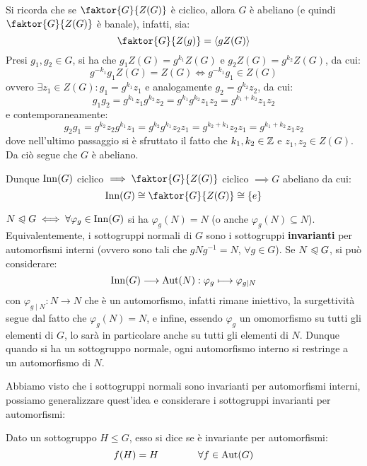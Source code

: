 \documentclass[11pt]{scrartcl}
\begin{document}
\begin{remark}
    Si ricorda che se $\faktor{G}{Z(G)}$ è ciclico, allora $G$ è abeliano (e quindi $\faktor{G}{Z(G)}$ è banale), infatti, sia:
        \[ \faktor{G}{Z(g)} = \left<gZ(G)\right>
            \]
    Presi $g_1,g_2 \in G$, si ha che $g_1Z(G) = g^{k_1}Z(G)$ e $g_2Z(G) = g^{k_2}Z(G)$, da cui:
        \[ g^{-k_1}g_1Z(G) = Z(G) \iff  g^{-k_1}g_1 \in Z(G)
            \]
    ovvero $\exists z_1 \in Z(G): g_1 = g^{k_1}z_1$ e analogamente $g_2 = g^{k_2}z_2$, da cui:
        \[ g_1g_2 = g^{k_1}z_1g^{k_2}z_2 = g^{k_1}g^{k_2}z_1z_2 = g^{k_1+k_2}z_1z_2
            \]
    e contemporaneamente:
        \[ g_2g_1 = g^{k_2}z_2g^{k_1}z_1 = g^{k_2}g^{k_1}z_2z_1 = g^{k_2 + k_1}z_2z_1 = g^{k_1+k_2}z_1z_2
            \]
    dove nell'ultimo passaggio si è sfruttato il fatto che $k_1,k_2 \in \mathbb Z$ e $z_1,z_2 \in Z(G)$. Da ciò segue che $G$ è abeliano.
\end{remark}

\begin{remark}
    Dunque $\operatorname{Inn}(G)$ ciclico $\implies \faktor{G}{Z(G)}$ ciclico $\implies G$ abeliano da cui:  
        \[ \Inn(G) \cong \faktor{G}{Z(G)} \cong \{e\}
            \]
\end{remark}

\begin{remark}
    $N \trianglelefteqslant G \iff \forall \varphi_g \in \operatorname{Inn}(G)$ si ha $\varphi_g(N) = N$ (o anche $\varphi_g(N) \subseteq N$). Equivalentemente, i sottogruppi
    normali di $G$ sono i sottogruppi \textbf{invarianti} per automorfismi interni (ovvero sono tali che $gNg^{-1} = N$, $\forall g \in G$). Se $N \trianglelefteqslant G$, si può considerare:
        \[ \operatorname{Inn}(G) \longrightarrow \operatorname{Aut}(N) : \varphi_g \longmapsto \varphi_{g \mid N}
            \]
    con $\varphi_{g \mid N} : N \longrightarrow N$ che è un automorfismo, infatti rimane iniettivo, la surgettività segue dal fatto che $\varphi_g(N) = N$, e infine, essendo $\varphi_g$ 
    un omomorfismo su tutti gli elementi di $G$, lo sarà in particolare anche su tutti gli elementi di $N$. Dunque quando si ha un sottogruppo normale, ogni automorfismo interno si restringe
    a un automorfismo di $N$.
\end{remark}

Abbiamo visto che i sottogruppi normali sono invarianti per automorfismi interni, possiamo generalizzare quest'idea e considerare i sottogruppi invarianti per automorfismi:

\begin{definition}
    Dato un sottogruppo $H \leqslant G$, esso si dice  se è invariante per automorfismi:
        \[ f(H) = H
        \qquad \qquad \forall f \in \operatorname{Aut}(G)
            \]
\end{definition}
\end{document}
